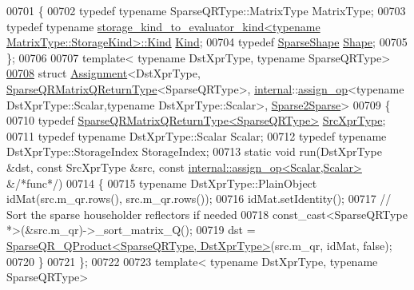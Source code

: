 \begin{DoxyCode}
00701 \{
00702   \textcolor{keyword}{typedef} \textcolor{keyword}{typename} SparseQRType::MatrixType MatrixType;
00703   \textcolor{keyword}{typedef} \textcolor{keyword}{typename} 
      \hyperlink{struct_eigen_1_1internal_1_1_index_based}{storage\_kind\_to\_evaluator\_kind<typename MatrixType::StorageKind>::Kind}
       \hyperlink{struct_eigen_1_1internal_1_1_index_based}{Kind};
00704   \textcolor{keyword}{typedef} \hyperlink{struct_eigen_1_1_sparse_shape}{SparseShape} \hyperlink{struct_eigen_1_1_sparse_shape}{Shape};
00705 \};
00706 
00707 \textcolor{keyword}{template}< \textcolor{keyword}{typename} DstXprType, \textcolor{keyword}{typename} SparseQRType>
\hyperlink{struct_eigen_1_1internal_1_1_assignment_3_01_dst_xpr_type_00_01_sparse_q_r_matrix_q_return_type_359637caee80b00c35b5e63bb0a6509c}{00708} \textcolor{keyword}{struct }\hyperlink{struct_eigen_1_1internal_1_1_assignment}{Assignment}<DstXprType, \hyperlink{struct_eigen_1_1_sparse_q_r_matrix_q_return_type}{SparseQRMatrixQReturnType}<SparseQRType>, 
      \hyperlink{namespaceinternal}{internal}::\hyperlink{struct_eigen_1_1internal_1_1assign__op}{assign\_op}<typename DstXprType::Scalar,typename DstXprType::Scalar>, 
      \hyperlink{struct_eigen_1_1internal_1_1_sparse2_sparse}{Sparse2Sparse}>
00709 \{
00710   \textcolor{keyword}{typedef} \hyperlink{struct_eigen_1_1_sparse_q_r_matrix_q_return_type}{SparseQRMatrixQReturnType<SparseQRType>} 
      \hyperlink{struct_eigen_1_1_sparse_q_r_matrix_q_return_type}{SrcXprType};
00711   \textcolor{keyword}{typedef} \textcolor{keyword}{typename} DstXprType::Scalar Scalar;
00712   \textcolor{keyword}{typedef} \textcolor{keyword}{typename} DstXprType::StorageIndex StorageIndex;
00713   \textcolor{keyword}{static} \textcolor{keywordtype}{void} run(DstXprType &dst, \textcolor{keyword}{const} SrcXprType &src, \textcolor{keyword}{const} 
      \hyperlink{struct_eigen_1_1internal_1_1assign__op}{internal::assign\_op<Scalar,Scalar>} &\textcolor{comment}{/*func*/})
00714   \{
00715     \textcolor{keyword}{typename} DstXprType::PlainObject idMat(src.m\_qr.rows(), src.m\_qr.rows());
00716     idMat.setIdentity();
00717     \textcolor{comment}{// Sort the sparse householder reflectors if needed}
00718     \textcolor{keyword}{const\_cast<}SparseQRType *\textcolor{keyword}{>}(&src.m\_qr)->\_sort\_matrix\_Q();
00719     dst = \hyperlink{struct_eigen_1_1_sparse_q_r___q_product}{SparseQR\_QProduct<SparseQRType, DstXprType>}(src.m\_qr, 
      idMat, \textcolor{keyword}{false});
00720   \}
00721 \};
00722 
00723 \textcolor{keyword}{template}< \textcolor{keyword}{typename} DstXprType, \textcolor{keyword}{typename} SparseQRType>

\end{DoxyCode}
